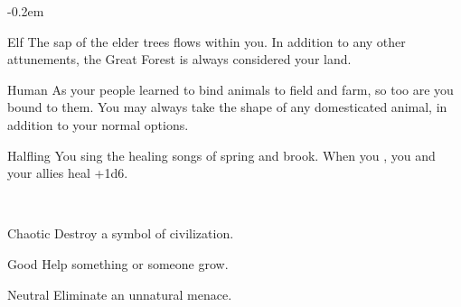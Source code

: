 \documentclass[8pt]{extarticle}
\begin{document}
\openup -0.2em

\charbanner

\begin{minipage}[t]{3.2in}


\begin{optfeature}{Elf}
  The sap of the elder trees flows within you. In addition to any
  other attunements, the Great Forest is always considered your land.
\end{optfeature}

\begin{optfeature}{Human}
  As your people learned to bind animals to field and farm, so too are
  you bound to them. You may always take the shape of any domesticated
  animal, in addition to your normal options.
\end{optfeature}

\begin{optfeature}{Halfling}
  You sing the healing songs of spring and brook. When you , you and your allies heal +1d6.
\end{optfeature}

\


\begin{optfeature}{Chaotic}
  Destroy a symbol of civilization.
\end{optfeature}

\begin{optfeature}{Good}
  Help something or someone grow.
\end{optfeature}

\begin{optfeature}{Neutral}
  Eliminate an unnatural menace.
\end{optfeature}


\


\vfill\null
\end{minipage}
\end{document}
